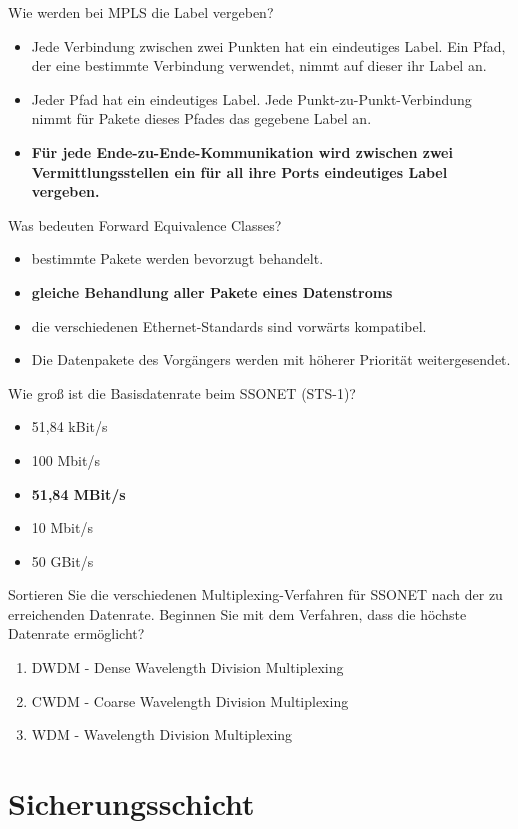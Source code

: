 \documentclass{article}
\begin{document}
	Wie werden bei MPLS die Label vergeben? 
	\begin{itemize}
		\item Jede Verbindung zwischen zwei Punkten hat ein eindeutiges Label. Ein Pfad, der eine bestimmte Verbindung verwendet, nimmt auf dieser ihr Label an.
		\item Jeder Pfad hat ein eindeutiges Label. Jede Punkt-zu-Punkt-Verbindung nimmt für Pakete dieses Pfades das gegebene Label an. 
		\item \textbf{Für jede Ende-zu-Ende-Kommunikation wird zwischen zwei Vermittlungsstellen ein für all ihre Ports eindeutiges Label vergeben. }
	\end{itemize}

	Was bedeuten Forward Equivalence Classes?
	\begin{itemize}
		\item bestimmte Pakete werden bevorzugt behandelt. 
		\item \textbf{gleiche Behandlung aller Pakete eines Datenstroms }
		\item die verschiedenen Ethernet-Standards sind vorwärts kompatibel.
		\item Die Datenpakete des Vorgängers werden mit höherer Priorität weitergesendet.
	\end{itemize}

	Wie groß ist die Basisdatenrate beim SSONET (STS-1)? 
	\begin{itemize}
		\item 51,84 kBit/s 
		\item 100 Mbit/s
		\item \textbf{51,84 MBit/s}
		\item 10 Mbit/s
		\item 50 GBit/s
	\end{itemize}

	Sortieren Sie die verschiedenen Multiplexing-Verfahren für SSONET nach der zu erreichenden Datenrate. Beginnen Sie mit dem Verfahren, dass die höchste Datenrate ermöglicht?
	\begin{enumerate}
		\item DWDM - Dense Wavelength Division Multiplexing
		\item CWDM - Coarse Wavelength Division Multiplexing 
		\item WDM - Wavelength Division Multiplexing
	\end{enumerate}
	
	\section{Sicherungsschicht}
	
\end{document}
